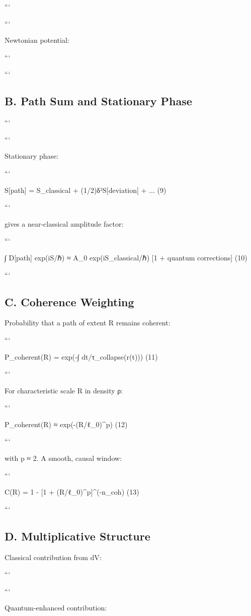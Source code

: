 \documentclass[11pt,a4paper]{article}
\begin{document}
```

```


Newtonian potential:

```

```


\subsection{B. Path Sum and Stationary Phase}


```

```


Stationary phase:

```

S[path] = S\_classical + (1/2)δ²S[deviation] + ...     (9)

```


gives a near‑classical amplitude factor:

```

∫ D[path] exp(iS/ℏ) ≈ A\_0 exp(iS\_classical/ℏ) [1 + quantum corrections]     (10)

```


\subsection{C. Coherence Weighting}


Probability that a path of extent R remains coherent:

```

P\_coherent(R) = exp(-∫ dt/τ\_collapse(r(t)))     (11)

```


For characteristic scale R in density ρ:

```

P\_coherent(R) ≈ exp(-(R/ℓ\_0)^p)     (12)

```


with p ≈ 2. A smooth, causal window:

```

C(R) = 1 - [1 + (R/ℓ\_0)^p]^(-n\_coh)     (13)

```


\subsection{D. Multiplicative Structure}


Classical contribution from dV:

```

```

Quantum‑enhanced contribution:
\end{document}
